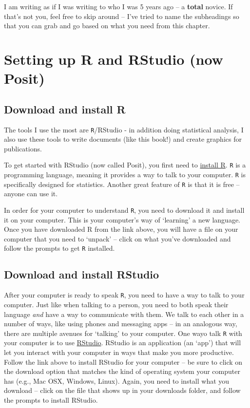 \documentclass[
]{book}
\begin{document}
I am writing as if I was writing to who I was 5 years ago -- a \textbf{total} novice. If that's not you, feel free to skip around -- I've tried to name the subheadings so that you can grab and go based on what you need from this chapter.

\hypertarget{setting-up-r-and-rstudio-now-posit}{%
\section{Setting up R and RStudio (now Posit)}\label{setting-up-r-and-rstudio-now-posit}}

\hypertarget{download-and-install-r}{%
\subsection{Download and install R}\label{download-and-install-r}}

The tools I use the most are \texttt{R}/RStudio - in addition doing statistical analysis, I also use these tools to write documents (like this book!) and create graphics for publications.

To get started with RStudio (now called Posit), you first need to \href{https://www.r-project.org/}{install R}. \texttt{R} is a programming language, meaning it provides a way to talk to your computer. \texttt{R} is specifically designed for statistics. Another great feature of \texttt{R} is that it is free -- anyone can use it.

In order for your computer to understand \texttt{R}, you need to download it and install it on your computer. This is your computer's way of `learning' a new language. Once you have downloaded R from the link above, you will have a file on your computer that you need to `unpack' -- click on what you've downloaded and follow the prompts to get \texttt{R} installed.

\hypertarget{download-and-install-rstudio}{%
\subsection{Download and install RStudio}\label{download-and-install-rstudio}}

After your computer is ready to speak \texttt{R}, you need to have a way to talk to your computer. Just like when talking to a person, you need to both speak their language \emph{and} have a way to communicate with them. We talk to each other in a number of ways, like using phones and messaging apps -- in an analogous way, there are multiple avenues for `talking' to your computer. One wayo talk \texttt{R} with your computer is to use \href{https://posit.co/download/rstudio-desktop/}{RStudio}. RStudio is an application (an `app') that will let you interact with your computer in ways that make you more productive. Follow the link above to install RStudio for your computer -- be sure to click on the download option that matches the kind of operating system your computer has (e.g., Mac OSX, Windows, Linux). Again, you need to install what you download -- click on the file that shows up in your downloads folder, and follow the prompts to install RStudio.
\end{document}
